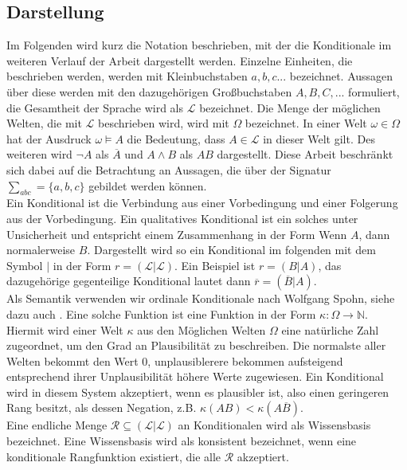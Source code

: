 \documentclass[12pt,a4paper]{article}
\newcommand{\lag}{\mathcal{L}}
\begin{document}
\subsection{Darstellung}
Im Folgenden wird kurz die Notation beschrieben, mit der die Konditionale im weiteren Verlauf der Arbeit dargestellt werden. Einzelne Einheiten, die beschrieben werden, werden mit Kleinbuchstaben $a, b, c ...$ bezeichnet. Aussagen über diese werden mit den dazugehörigen Großbuchstaben $A, B, C, ...$ formuliert, die Gesamtheit der Sprache wird als $\lag$ bezeichnet. Die Menge der möglichen Welten, die mit $\lag$ beschrieben wird, wird mit $\Omega$ bezeichnet. In einer Welt $\omega \in \Omega$  hat der Ausdruck $\omega \models A$ die Bedeutung, dass $A \in \lag$ in dieser Welt gilt. Des weiteren wird $\neg A$ als $\overline{A}$ und $A \wedge B$ als $AB$ dargestellt. Diese Arbeit beschränkt sich dabei auf die Betrachtung an Aussagen, die über der Signatur $\sum_{abc} = \{a, b, c\}$ gebildet werden können. \\
Ein Konditional ist die Verbindung aus einer Vorbedingung und einer Folgerung aus der Vorbedingung. Ein qualitatives Konditional ist ein solches unter  Unsicherheit und entspricht einem Zusammenhang in der Form \glqq Wenn $A$, dann normalerweise $B$\grqq . Dargestellt wird so ein Konditional  im folgenden mit dem Symbol $|$ in der Form $r = ( \lag | \lag)$. Ein Beispiel ist $r = (B|A)$, das dazugehörige gegenteilige Konditional lautet dann $\overline{r} = (\overline{B}|A)$.\\
Als Semantik verwenden wir ordinale Konditionale nach Wolfgang Spohn, siehe dazu auch \cite{spohn12}. Eine solche Funktion ist eine Funktion in der Form $\kappa :  \Omega \rightarrow \mathbb{N} $. Hiermit wird einer Welt $\kappa$ aus den Möglichen Welten $\Omega$ eine natürliche Zahl zugeordnet, um den Grad an Plausibilität zu beschreiben. Die normalste aller Welten bekommt den Wert 0, unplausiblerere bekommen aufsteigend entsprechend ihrer Unplausibilität höhere Werte zugewiesen. Ein Konditional wird in diesem System akzeptiert, wenn es plausibler ist, also einen geringeren Rang besitzt, als dessen Negation, z.B. $\kappa(AB)<\kappa(A\overline{B})$. \\
Eine endliche Menge $\mathcal{R} \subseteq (\lag | \lag)$ an Konditionalen wird als Wissensbasis bezeichnet. Eine Wissensbasis wird als konsistent bezeichnet, wenn eine konditionale Rangfunktion existiert, die alle $\mathcal{R}$ akzeptiert.
\end{document}
